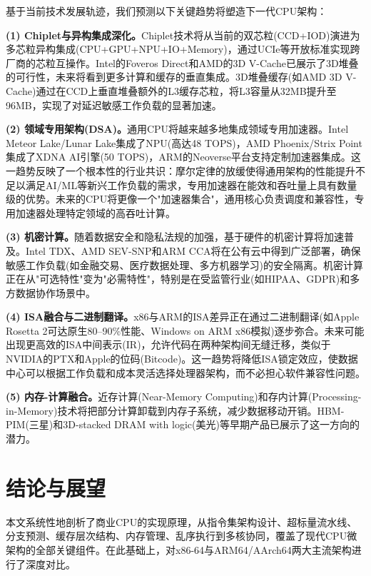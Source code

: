 \documentclass[12pt,a4paper]{IEEEtran}
\begin{document}
基于当前技术发展轨迹，我们预测以下关键趋势将塑造下一代CPU架构：

\textbf{(1) Chiplet与异构集成深化。}Chiplet技术将从当前的双芯粒(CCD+IOD)演进为多芯粒异构集成(CPU+GPU+NPU+IO+Memory)，通过UCIe等开放标准实现跨厂商的芯粒互操作。Intel的Foveros Direct和AMD的3D V-Cache已展示了3D堆叠的可行性，未来将看到更多计算和缓存的垂直集成。3D堆叠缓存(如AMD 3D V-Cache)通过在CCD上垂直堆叠额外的L3缓存芯粒，将L3容量从32MB提升至96MB，实现了对延迟敏感工作负载的显著加速。

\textbf{(2) 领域专用架构(DSA)。}通用CPU将越来越多地集成领域专用加速器。Intel Meteor Lake/Lunar Lake集成了NPU(高达48 TOPS)，AMD Phoenix/Strix Point集成了XDNA AI引擎(50 TOPS)，ARM的Neoverse平台支持定制加速器集成。这一趋势反映了一个根本性的行业共识：摩尔定律的放缓使得通用架构的性能提升不足以满足AI/ML等新兴工作负载的需求，专用加速器在能效和吞吐量上具有数量级的优势。未来的CPU将更像一个"加速器集合"，通用核心负责调度和兼容性，专用加速器处理特定领域的高吞吐计算。

\textbf{(3) 机密计算。}随着数据安全和隐私法规的加强，基于硬件的机密计算将加速普及。Intel TDX、AMD SEV-SNP和ARM CCA将在公有云中得到广泛部署，确保敏感工作负载(如金融交易、医疗数据处理、多方机器学习)的安全隔离。机密计算正在从"可选特性"变为"必需特性"，特别是在受监管行业(如HIPAA、GDPR)和多方数据协作场景中。

\textbf{(4) ISA融合与二进制翻译。}x86与ARM的ISA差异正在通过二进制翻译(如Apple Rosetta 2可达原生80--90\%性能、Windows on ARM x86模拟)逐步弥合。未来可能出现更高效的ISA中间表示(IR)，允许代码在两种架构间无缝迁移，类似于NVIDIA的PTX和Apple的位码(Bitcode)。这一趋势将降低ISA锁定效应，使数据中心可以根据工作负载和成本灵活选择处理器架构，而不必担心软件兼容性问题。

\textbf{(5) 内存-计算融合。}近存计算(Near-Memory Computing)和存内计算(Processing-in-Memory)技术将把部分计算卸载到内存子系统，减少数据移动开销。HBM-PIM(三星)和3D-stacked DRAM with logic(美光)等早期产品已展示了这一方向的潜力。

\section{结论与展望}

本文系统性地剖析了商业CPU的实现原理，从指令集架构设计、超标量流水线、分支预测、缓存层次结构、内存管理、乱序执行到多核协同，覆盖了现代CPU微架构的全部关键组件。在此基础上，对x86-64与ARM64/AArch64两大主流架构进行了深度对比。
\end{document}
